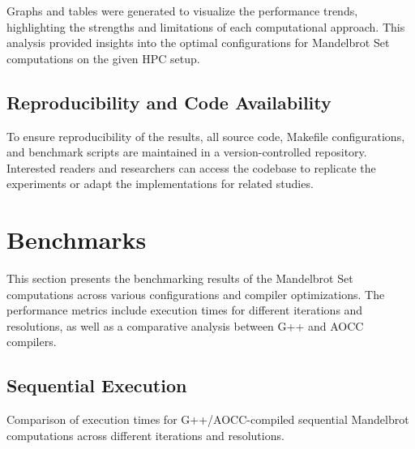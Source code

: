 \documentclass[
	report, %
	11pt, %
]{CSUniSchoolLabReport}
\newcounter{ct}
\begin{document}
Graphs and tables were generated to visualize the performance trends, highlighting the strengths and limitations of each computational approach. This analysis provided insights into the optimal configurations for Mandelbrot Set computations on the given HPC setup.

\subsection{Reproducibility and Code Availability}

To ensure reproducibility of the results, all source code, Makefile configurations, and benchmark scripts are maintained in a version-controlled repository. Interested readers and researchers can access the codebase to replicate the experiments or adapt the implementations for related studies.

\section{Benchmarks}

This section presents the benchmarking results of the Mandelbrot Set computations across various configurations and compiler optimizations. The performance metrics include execution times for different iterations and resolutions, as well as a comparative analysis between G++ and AOCC compilers.

\subsection{Sequential Execution}

\begin{table}[H]
	\centering
	\captionsetup{justification=centering, width=.8\linewidth}
	
	\caption{Comparison of execution times for G++/AOCC-compiled sequential Mandelbrot computations across different iterations and resolutions.}
	\label{tab:mandelbrot_gcc_vs_aocc_comparison}
\end{table}
\end{document}
